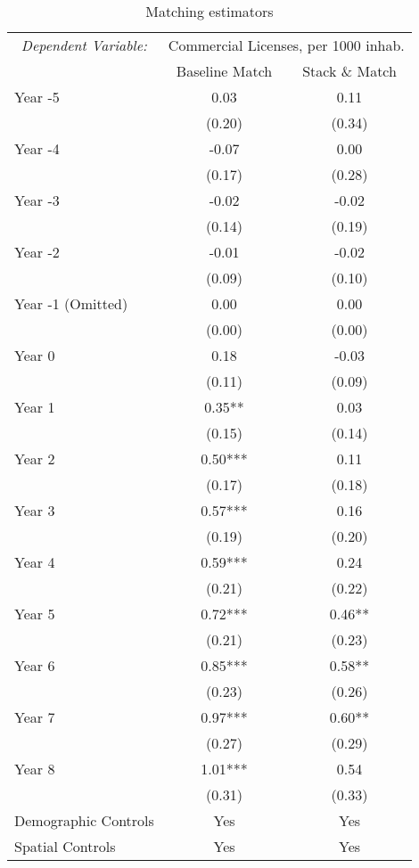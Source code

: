 \begin{table}[H]

\caption{\label{tab:apptable4}Matching estimators}
\centering
\begin{threeparttable}
\begin{tabular}[t]{lcc}
\toprule
\multicolumn{1}{c}{\textit{Dependent Variable:}} & \multicolumn{2}{c}{Commercial Licenses, per 1000 inhab.} \\
\cmidrule(l{3pt}r{3pt}){1-1} \cmidrule(l{3pt}r{3pt}){2-3}
\multicolumn{1}{c}{ } & \multicolumn{1}{c}{Baseline Match} & \multicolumn{1}{c}{Stack \& Match} \\
\cmidrule(l{3pt}r{3pt}){2-2} \cmidrule(l{3pt}r{3pt}){3-3}
Year -5 & 0.03 & 0.11\\
 & (0.20) & (0.34)\\
Year -4 & -0.07 & 0.00\\
 & (0.17) & (0.28)\\
Year -3 & -0.02 & -0.02\\
 & (0.14) & (0.19)\\
Year -2 & -0.01 & -0.02\\
 & (0.09) & (0.10)\\
Year -1 (Omitted) & 0.00 & 0.00\\
 & (0.00) & (0.00)\\
Year 0 & 0.18 & -0.03\\
 & (0.11) & (0.09)\\
Year 1 & 0.35** & 0.03\\
 & (0.15) & (0.14)\\
Year 2 & 0.50*** & 0.11\\
 & (0.17) & (0.18)\\
Year 3 & 0.57*** & 0.16\\
 & (0.19) & (0.20)\\
Year 4 & 0.59*** & 0.24\\
 & (0.21) & (0.22)\\
Year 5 & 0.72*** & 0.46**\\
 & (0.21) & (0.23)\\
Year 6 & 0.85*** & 0.58**\\
 & (0.23) & (0.26)\\
Year 7 & 0.97*** & 0.60**\\
 & (0.27) & (0.29)\\
Year 8 & 1.01*** & 0.54\\
 & (0.31) & (0.33)\\
\midrule
Demographic Controls & Yes & Yes\\
Spatial Controls & Yes & Yes\\

\end{tabular}
\end{threeparttable}
\end{table}
